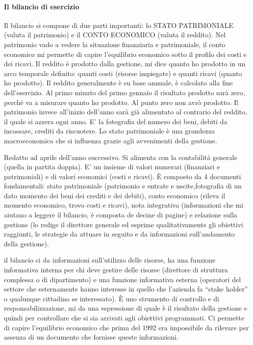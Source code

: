 \paragraph{Il bilancio di esercizio}

Il bilancio si compone di due parti importanti: lo STATO PATRIMONIALE (valuta il patrimonio) e il CONTO ECONOMICO (valuta il reddito). Nel patrimonio vado a vedere la situazione finanziaria e patrimoniale, il
conto economico mi permette di capire l'equilibrio economico sotto il
profilo dei costi e dei ricavi. Il reddito è prodotto dalla gestione, mi
dice quanto ho prodotto in un arco temporale definito: quanti costi
(risorse impiegate) e quanti ricavi (quanto ho prodotto). Il reddito
generalmente è su base annuale, è calcolato alla fine dell'esercizio. Al
primo minuto del primo gennaio il risultato prodotto sarà zero, perchè
va a misurare quanto ho prodotto. Al punto zero non avrò prodotto. Il
patrimonio invece all'inizio dell'anno sarà già alimentato al contrario
del reddito, il quale si azzera ogni anno. E' la fotografia del numero
dei beni, debiti da incassare, crediti da riscuotere. Lo stato
patrimoniale è una grandezza macroeconomica che si influenza grazie agli
avvenimenti della gestione.

Redatto ad aprile dell'anno successivo. Si alimenta con la contabilità
generale (quella in partita doppia). E' un insieme di valori numerari
(finanziari e patrimoniali) e di valori economici (costi e ricavi). È
composto da 4 documenti fondamentali: stato patrimoniale (patrimonio e
entrate e uscite,fotografia di un dato momento dei beni dei crediti e
dei debiti), conto economico (rileva il momento economico, trovo costi e
ricavi), nota integrativa (informazioni che mi aiutano a leggere il
bilancio, è composta de decine di pagine) e relazione sulla gestione (lo
redige il direttore generale ed esprime qualitativamente gli obiettivi
raggiunti, le strategie da attuare in seguito e da informazioni
sull'andamento della gestione).

il bilancio ci da informazioni sull'utilizzo delle risorse, ha una
funzione informativa interna per chi deve gestire delle risorse
(direttore di struttura complessa o di dipartimento) e una funzione
informativa esterna (operatori del settore che esternamente hanno
interesse in quello che l'azienda fa ``stake holder'' o qualunque
cittadino se interessato). È uno strumento di controllo e di
responsabilizzazione, mi da una espressione di quale è il risultato
della gestione e quindi per controllare che si sia arrivati agli
obiettivi programmati. Ci permette di capire l'equilibrio economico che
prima del 1992 era impossibile da rilevare per assenza di un documento
che fornisse queste informazioni.

